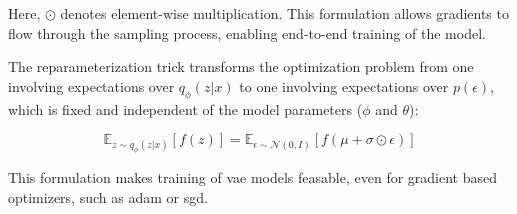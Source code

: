 Here, $\odot$ denotes element-wise multiplication. This formulation allows gradients to flow through the sampling process, enabling end-to-end training of the model.

The reparameterization trick transforms the optimization problem from one involving expectations over $q_\phi(z|x)$ to one involving expectations over $p(\epsilon)$, which is fixed and independent of the model parameters ($\phi$ and $\theta$):

\begin{equation}
    \mathbb{E}_{z \sim q_\phi(z|x)}[f(z)] = \mathbb{E}_{\epsilon \sim \mathcal{N}(0,I)}[f(\mu + \sigma \odot \epsilon)]
\end{equation}

This formulation makes training of \acrshort{vae} models feasable, even for gradient based optimizers, such as \acrshort{adam} or \acrshort{sgd}.




